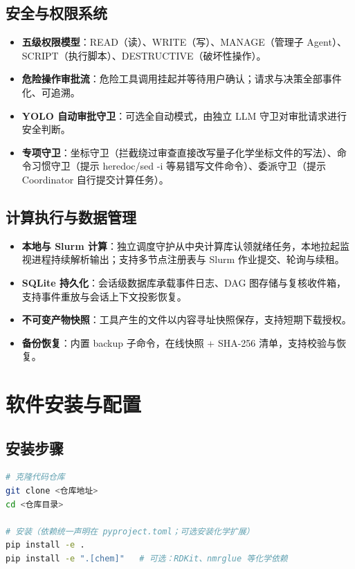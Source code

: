 \documentclass[zihao=-4,a4paper,fontset=none]{ctexart}
\begin{document}
\subsection{安全与权限系统}
\begin{itemize}[itemsep=2pt]
  \item \textbf{五级权限模型}：READ（读）、WRITE（写）、MANAGE（管理子 Agent）、SCRIPT（执行脚本）、DESTRUCTIVE（破坏性操作）。
  \item \textbf{危险操作审批流}：危险工具调用挂起并等待用户确认；请求与决策全部事件化、可追溯。
  \item \textbf{YOLO 自动审批守卫}：可选全自动模式，由独立 LLM 守卫对审批请求进行安全判断。
  \item \textbf{专项守卫}：坐标守卫（拦截绕过审查直接改写量子化学坐标文件的写法）、命令习惯守卫（提示 heredoc/sed -i 等易错写文件命令）、委派守卫（提示 Coordinator 自行提交计算任务）。
\end{itemize}

\subsection{计算执行与数据管理}
\begin{itemize}[itemsep=2pt]
  \item \textbf{本地与 Slurm 计算}：独立调度守护从中央计算库认领就绪任务，本地拉起监视进程持续解析输出；支持多节点注册表与 Slurm 作业提交、轮询与续租。
  \item \textbf{SQLite 持久化}：会话级数据库承载事件日志、DAG 图存储与复核收件箱，支持事件重放与会话上下文投影恢复。
  \item \textbf{不可变产物快照}：工具产生的文件以内容寻址快照保存，支持短期下载授权。
  \item \textbf{备份恢复}：内置 backup 子命令，在线快照 + SHA-256 清单，支持校验与恢复。
\end{itemize}

\section{软件安装与配置}

\subsection{安装步骤}
\begin{lstlisting}[language=bash]
# 克隆代码仓库
git clone <仓库地址>
cd <仓库目录>

# 安装（依赖统一声明在 pyproject.toml；可选安装化学扩展）
pip install -e .
pip install -e ".[chem]"   # 可选：RDKit、nmrglue 等化学依赖
\end{lstlisting}
\end{document}
